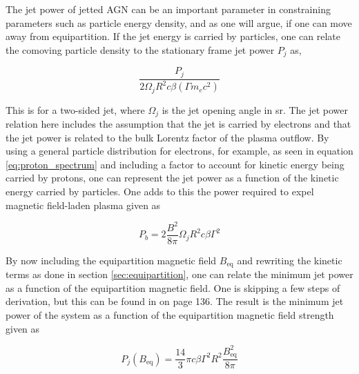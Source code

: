 
The jet power of jetted AGN can be an important parameter in constraining parameters such as particle energy density, and as one will argue, if one can move away from equipartition. If the jet energy is carried by particles, one can relate the comoving particle density to the stationary frame jet power $P_j$ as,

\begin{equation}
    \frac{P_j}{2\Omega_j R^2 c \beta (\Gamma m_e c^2)}
\end{equation}

This is for a two-sided jet, where $\Omega_j$ is the jet opening angle in sr. The jet power relation here includes the assumption that the jet is carried by electrons and that the jet power is related to the bulk Lorentz factor of the plasma outflow. By using a general particle distribution for electrons, for example, as seen in equation \ref{eq:proton_spectrum} and including a factor to account for kinetic energy being carried by protons, one can represent the jet power as a function of the kinetic energy carried by particles. One adds to this the power required to expel magnetic field-laden plasma given as

\begin{equation}
    P_b = 2 \frac{B^2}{8\pi} \Omega_j R^2 c \beta \Gamma^2
\end{equation}

By now including the equipartition magnetic field $B_{\text{eq}}$ and rewriting the kinetic terms as done in section \ref{sec:equipartition}, one can relate the minimum jet power as a function of the equipartition magnetic field. One is skipping a few steps of derivation, but this can be found in \cite{BHradiation} on page 136. The result is the minimum jet power of the system as a function of the equipartition magnetic field strength given as

\begin{equation}
    P_j(B_{\text{eq}}) = \frac{14}{3}\pi c \beta \Gamma^2 R^2 \frac{B_{\text{eq}}^2}{8 \pi}
\end{equation}


